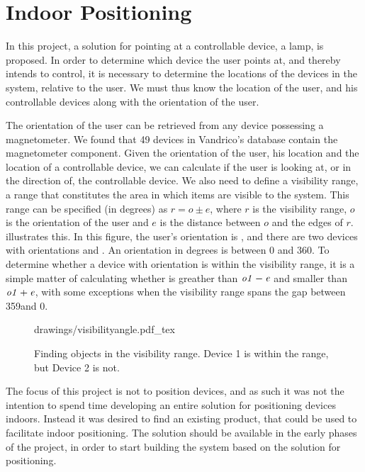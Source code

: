 \section{Indoor Positioning}\label{sec:analysis:indoor-positioning}
In this project, a solution for pointing at a controllable device, \eg a lamp, is proposed. 
In order to determine which device the user points at, 
and thereby intends to control, 
it is necessary to determine the locations of the devices in the system, 
relative to the user. 
We must thus know the location of the user, 
and his controllable devices along with the orientation of the user.

The orientation of the user can be retrieved from any device possessing a magnetometer. 
We found that 49 devices in Vandrico's database contain the magnetometer component. 
Given the orientation of the user, his location and the location of a controllable device, 
we can calculate if the user is looking at, 
or in the direction of, the controllable device.
We also need to define a visibility range, \ie a range that constitutes the area in which items are visible to the system. This range can be specified (in degrees) as $r = o \pm e$, where $r$ is the visibility range, $o$ is the orientation of the user and $e$ is the distance between $o$ and the edges of $r$.
 illustrates this. 
In this figure, the user's orientation is , 
and there are two devices with orientations  and . 
An orientation in degrees is between \num{0} and \num{360}. 
To determine whether a device with orientation  is within the visibility range, 
it is a simple matter of calculating whether  is greather than $\var{o1}-\var{e}$ and smaller than $\var{o1}+\var{e}$, with some exceptions when the visibility range spans the gap between 359\degree and 0\degree.

\begin{figure}[!htb]
    \centering
    \def\svgwidth{0.6\textwidth}
    {drawings/visibilityangle.pdf_tex}
    \caption{Finding objects in the visibility range. Device 1 is within the range, but Device 2 is not.}
\label{fig:visibilityangle}
\end{figure}

The focus of this project is not to position devices, 
and as such it was not the intention to spend time developing an entire solution for positioning devices indoors. 
Instead it was desired to find an existing product, 
that could be used to facilitate indoor positioning.
The solution should be available in the early phases of the project, 
in order to start building the system based on the solution for positioning.

